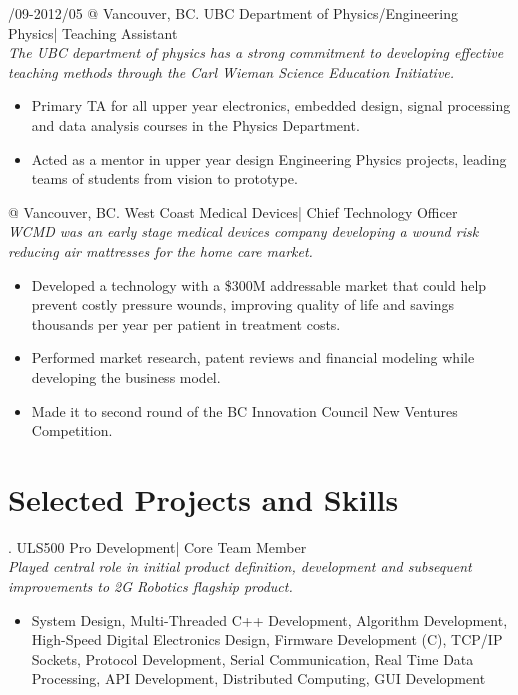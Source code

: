 \documentclass[10pt,letterpaper]{resume}
\begin{document}
/09-2012/05 @ Vancouver, BC. UBC Department of Physics/Engineering Physics| Teaching Assistant
\textit{\\The UBC department of physics has a strong commitment to developing effective teaching methods through the Carl Wieman Science Education Initiative.}
\begin{itemize}
\item Primary TA for all upper year electronics, embedded design, signal processing and data analysis courses in the Physics Department.
\item Acted as a mentor in upper year design Engineering Physics projects, leading teams of students from vision to prototype.
\end{itemize}

 @ Vancouver, BC. West Coast Medical Devices| Chief Technology Officer
\textit{\\WCMD was an early stage medical devices company developing a wound risk reducing air mattresses for the home care market.}
\begin{itemize}
\item Developed a technology with a \$300M addressable market that could help prevent costly pressure wounds, improving quality of life and savings thousands per year per patient in treatment costs.
\item Performed market research, patent reviews and financial modeling while developing the business model.
\item Made it to second round of the BC Innovation Council New Ventures Competition.
\end{itemize}


\section{Selected Projects and Skills}

\entry  . ULS500 Pro Development| Core Team Member
\textit{\\Played central role in initial product definition, development and subsequent improvements to 2G Robotics flagship product.}
\begin {itemize}
\item System Design, Multi-Threaded C++ Development, Algorithm Development, High-Speed Digital Electronics Design, Firmware Development (C), TCP/IP Sockets, Protocol Development, Serial Communication, Real Time Data Processing, API Development, Distributed Computing, GUI Development
\end {itemize}
\end{document}
